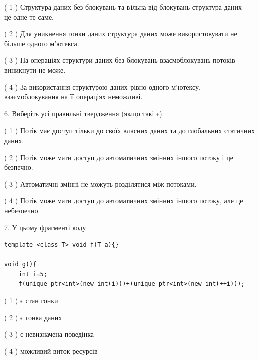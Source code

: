 \documentclass[12pt, ukrainian]{article}
\begin{document}
\begin {large}
{( 1 ) Структура даних без блокувань та вільна від блокувань структура даних --- це одне те саме.%

( 2 ) Для уникнення гонки даних структура даних може використовувати не більше одного м’ютекса.%

( 3 ) На операціях структури даних без блокувань взаємоблокувань потоків виникнути не може.%

( 4 ) За використання структурою даних рівно одного м’ютексу, взаємоблокування на її операціях неможливі.%
\newpage



\vspace{5mm}
6. Виберіть усі правильні твердження (якщо такі є).\par
\vspace{2mm}

( 1 ) Потік має доступ тільки до своїх власних даних та до глобальних статичних даних.%

( 2 ) Потік може мати доступ до автоматичних змінних іншого потоку і це безпечно.%

( 3 ) Автоматичні змінні не можуть розділятися між потоками.%

( 4 ) Потік може мати доступ до автоматичних змінних іншого потоку, але це небезпечно.%


\vspace{5mm}
7. У цьому фрагменті коду
\begin{verbatim}
template <class T> void f(T a){}

void g(){
    int i=5;
    f(unique_ptr<int>(new int(i)))+(unique_ptr<int>(new int(++i)));
\end{verbatim}
( 1 ) є стан гонки%

( 2 ) є гонка даних%

( 3 ) є невизначена поведінка%

( 4 ) можливий виток ресурсів%
}
\end {large}
\end{document}
